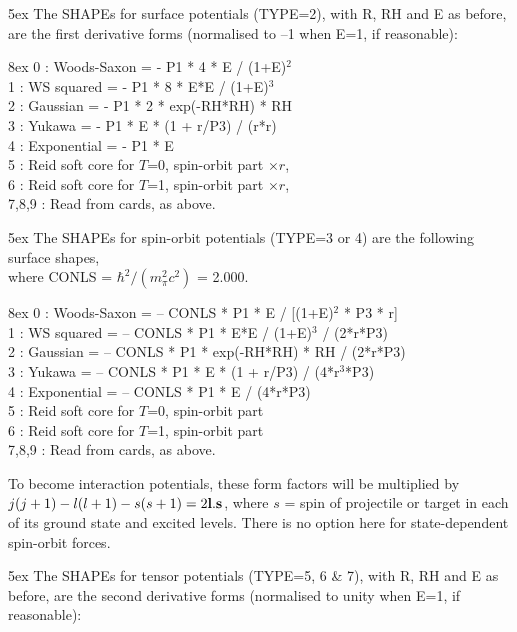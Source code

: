 \documentclass[11pt]{article}
\begin{document}
\hangindent 5ex
The SHAPEs for surface potentials (TYPE=2), with R, RH and E as before,
are the first derivative forms (normalised to --1 when E=1,
if reasonable):

\hangindent 8ex
      0 : Woods-Saxon  = - P1 * 4 * E / (1+E)$^2$ \\
      1 : WS squared   = - P1 * 8 * E*E / (1+E)$^3$\\
      2 : Gaussian     = - P1 * 2 * exp(-RH*RH) * RH\\
      3 : Yukawa       = - P1 * E * (1 + r/P3) / (r*r)\\
      4 : Exponential  = - P1 * E\\
      5 : Reid soft core for $T$=0, spin-orbit part $\times r$,\\
      6 : Reid soft core for $T$=1, spin-orbit part $\times r$,\\
      7,8,9 : Read from cards, as above.

\bigskip

\hangindent 5ex
The SHAPEs for spin-orbit potentials (TYPE=3 or 4) are the following surface
shapes, \\ where CONLS = $\hbar^2/(m_\pi^2 c^2)$ = 2.000.

\hangindent 8ex
      0 : Woods-Saxon  = -- CONLS * P1 *  E / [(1+E)$^2$ * P3 * r] \\
      1 : WS squared   = -- CONLS * P1 * E*E / (1+E)$^3$  / (2*r*P3) \\
      2 : Gaussian     = -- CONLS * P1 * exp(-RH*RH) * RH  / (2*r*P3) \\
      3 : Yukawa       = -- CONLS * P1 * E * (1 + r/P3) / (4*r$^3$*P3)\\
      4 : Exponential  = -- CONLS * P1 * E / (4*r*P3)\\
      5 : Reid soft core for $T$=0, spin-orbit part\\
      6 : Reid soft core for $T$=1, spin-orbit part\\
      7,8,9 : Read from cards, as above.

To become interaction potentials,
these form factors will be multiplied by
$j(j+1) - l(l+1) - s(s+1)= 2{\bf l}.{\bf s}$, where $s$ = spin of projectile or target
in each of its ground state and excited levels. There is no option here for
state-dependent spin-orbit forces.
\bigskip

\hangindent 5ex
The SHAPEs for tensor potentials (TYPE=5, 6 \& 7), with R, RH and E as before,
are the second derivative forms (normalised to unity when E=1,
if reasonable):
\end{document}
